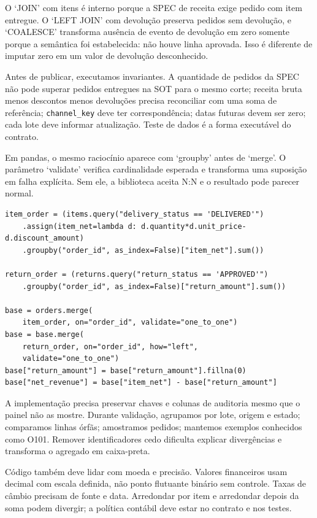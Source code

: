 O `JOIN' com itens é interno porque a SPEC de receita exige pedido com item entregue. O `LEFT JOIN' com devolução preserva pedidos sem devolução, e `COALESCE' transforma ausência de evento de devolução em zero somente porque a semântica foi estabelecida: não houve linha aprovada. Isso é diferente de imputar zero em um valor de devolução desconhecido.

Antes de publicar, executamos invariantes. A quantidade de pedidos da SPEC não pode superar pedidos entregues na SOT para o mesmo corte; receita bruta menos descontos menos devoluções precisa reconciliar com uma soma de referência; \texttt{channel\_key} deve ter correspondência; datas futuras devem ser zero; cada lote deve informar atualização. Teste de dados é a forma executável do contrato.

Em pandas, o mesmo raciocínio aparece com `groupby' antes de `merge'. O parâmetro `validate' verifica cardinalidade esperada e transforma uma suposição em falha explícita. Sem ele, a biblioteca aceita N:N e o resultado pode parecer normal.

\begin{verbatim}
item_order = (items.query("delivery_status == 'DELIVERED'")
    .assign(item_net=lambda d: d.quantity*d.unit_price-d.discount_amount)
    .groupby("order_id", as_index=False)["item_net"].sum())

return_order = (returns.query("return_status == 'APPROVED'")
    .groupby("order_id", as_index=False)["return_amount"].sum())

base = orders.merge(
    item_order, on="order_id", validate="one_to_one")
base = base.merge(
    return_order, on="order_id", how="left",
    validate="one_to_one")
base["return_amount"] = base["return_amount"].fillna(0)
base["net_revenue"] = base["item_net"] - base["return_amount"]
\end{verbatim}

A implementação precisa preservar chaves e colunas de auditoria mesmo que o painel não as mostre. Durante validação, agrupamos por lote, origem e estado; comparamos linhas órfãs; amostramos pedidos; mantemos exemplos conhecidos como O101. Remover identificadores cedo dificulta explicar divergências e transforma o agregado em caixa-preta.

Código também deve lidar com moeda e precisão. Valores financeiros usam decimal com escala definida, não ponto flutuante binário sem controle. Taxas de câmbio precisam de fonte e data. Arredondar por item e arredondar depois da soma podem divergir; a política contábil deve estar no contrato e nos testes.

